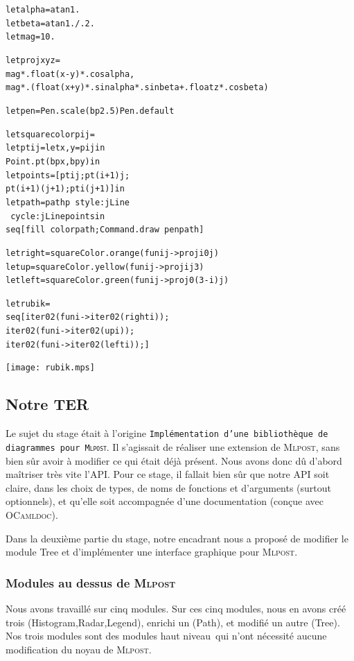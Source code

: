 \documentclass[a4paper,12pt]{article}
\newcommand{\mlpost}{\textsc{Mlpost}}
\begin{document}
\begin{minipage}{0.7\linewidth}
  \begin{alltt}
    let alpha = atan 1.
    let beta = atan 1. /. 2. 
    let mag = 10.
    
    let proj x y z = 
    mag *. float (x - y) *. cos alpha, 
    mag *. (float (x + y) *. sin alpha *. sin beta +. float z *. cos beta)
    
    let pen = Pen.scale (bp 2.5) Pen.default
  
    let square color p i j =
    let pt i j = let x,y = p i j in 
    Point.pt (bp x, bp y) in
    let points = [pt i j; pt (i+1) j; 
      pt (i+1) (j+1); pt i (j+1)] in
    let path = pathp ~style:jLine 
    ~cycle:jLine points in
    seq [fill ~color path; Command.draw ~pen path]
    
    let right = square Color.orange (fun i j -> proj i 0 j)
    let up = square Color.yellow (fun i j -> proj i j 3)
    let left = square Color.green (fun i j -> proj 0 (3 - i) j)
    
    let rubik = 
    seq [iter 0 2 (fun i -> iter 0 2 (right i));
      iter 0 2 (fun i -> iter 0 2 (up i));
      iter 0 2 (fun i -> iter 0 2 (left i));]
  \end{alltt}
\end{minipage}
\begin{minipage}{0.3\linewidth}
  \begin{center}
    \texttt{[image: rubik.mps]}
  \end{center}
\end{minipage}

\subsection{Notre TER}
Le sujet du stage était à l'origine \texttt{Implémentation d'une
  bibliothèque de diagrammes pour \mlpost}. Il s'agissait de réaliser une extension de \mlpost, sans bien sûr avoir à modifier ce qui était déjà présent. Nous avons donc dû d'abord maîtriser très vite l'API.
Pour ce stage, il fallait bien sûr que notre API soit claire, dans les choix de types, de noms de fonctions et d'arguments (surtout optionnels), et qu'elle soit accompagnée d'une documentation (conçue avec \textsc{OCamldoc}).

Dans la deuxième partie du stage, notre encadrant nous a proposé de modifier le module Tree et d'implémenter une interface graphique pour \mlpost.

\subsubsection{Modules au dessus de \mlpost}
Nous avons travaillé sur cinq modules. 
Sur ces cinq modules, nous en avons créé trois (Histogram,Radar,Legend), enrichi un (Path), et modifié un autre (Tree).
Nos trois modules sont des modules \og haut niveau\fg\ qui n'ont nécessité aucune modification du noyau de \mlpost. 
\end{document}
